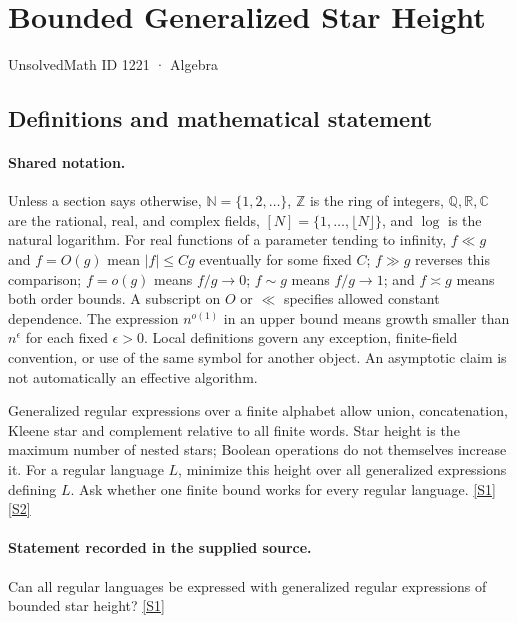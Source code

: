 \documentclass[11pt,a4paper]{article}
\newcommand{\N}{\mathbb{N}}
\newcommand{\Z}{\mathbb{Z}}
\newcommand{\Q}{\mathbb{Q}}
\newcommand{\R}{\mathbb{R}}
\newcommand{\C}{\mathbb{C}}
\newcommand{\sref}[2]{\hyperlink{source:#1:#2}{[S#2]}}
\begin{document}

\setcounter{section}{1220}

\section{Bounded Generalized Star Height}\label{1221}

{\small\sffamily UnsolvedMath ID 1221 · Algebra}

\subsection{Definitions and mathematical statement}

\paragraph{Shared notation.}Unless a section says otherwise, $\N=\{1,2,\ldots\}$,
$\Z$ is the ring of integers, $\Q,\R,\C$ are the rational, real, and complex
fields, $[N]=\{1,\ldots,\lfloor N\rfloor\}$, and $\log$ is the natural
logarithm. For real functions of a parameter tending to infinity,
$f\ll g$ and $f=O(g)$ mean $|f|\leq Cg$ eventually for some fixed $C$;
$f\gg g$ reverses this comparison; $f=o(g)$ means $f/g\to0$;
$f\sim g$ means $f/g\to1$; and $f\asymp g$ means both order bounds.
A subscript on $O$ or $\ll$ specifies allowed constant dependence.
The expression $n^{o(1)}$ in an upper bound means growth smaller than
$n^\epsilon$ for each fixed $\epsilon>0$. Local definitions govern any
exception, finite-field convention, or use of the same symbol for another
object. An asymptotic claim is not automatically an effective algorithm.



Generalized regular expressions over a finite alphabet allow union, concatenation, Kleene star and complement relative to all finite words. Star height is the maximum number of nested stars; Boolean operations do not themselves increase it. For a regular language $L$, minimize this height over all generalized expressions defining $L$. Ask whether one finite bound works for every regular language. \sref{1221}{1} \sref{1221}{2}

\paragraph{Statement recorded in the supplied source.}
Can all regular languages be expressed with generalized regular expressions of bounded star height? \sref{1221}{1}
\end{document}
